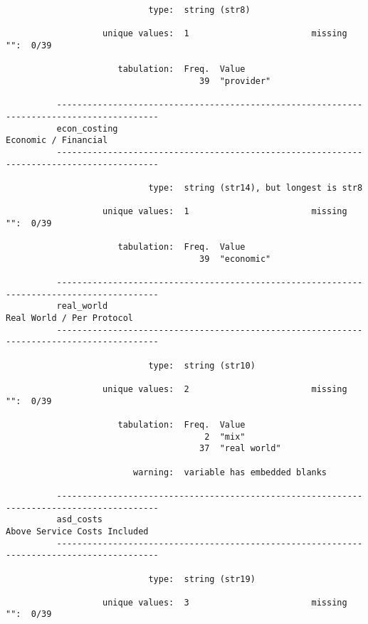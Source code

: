 \documentclass{article}
\begin{document}
\begin{verbatim}
                            type:  string (str8)
          
                   unique values:  1                        missing "":  0/39
          
                      tabulation:  Freq.  Value
                                      39  "provider"
          
          ------------------------------------------------------------------------------------------
          econ_costing                                                          Economic / Financial
          ------------------------------------------------------------------------------------------
          
                            type:  string (str14), but longest is str8
          
                   unique values:  1                        missing "":  0/39
          
                      tabulation:  Freq.  Value
                                      39  "economic"
          
          ------------------------------------------------------------------------------------------
          real_world                                                       Real World / Per Protocol
          ------------------------------------------------------------------------------------------
          
                            type:  string (str10)
          
                   unique values:  2                        missing "":  0/39
          
                      tabulation:  Freq.  Value
                                       2  "mix"
                                      37  "real world"
          
                         warning:  variable has embedded blanks
          
          ------------------------------------------------------------------------------------------
          asd_costs                                                     Above Service Costs Included
          ------------------------------------------------------------------------------------------
          
                            type:  string (str19)
          
                   unique values:  3                        missing "":  0/39
          

\end{verbatim}
\end{document}
